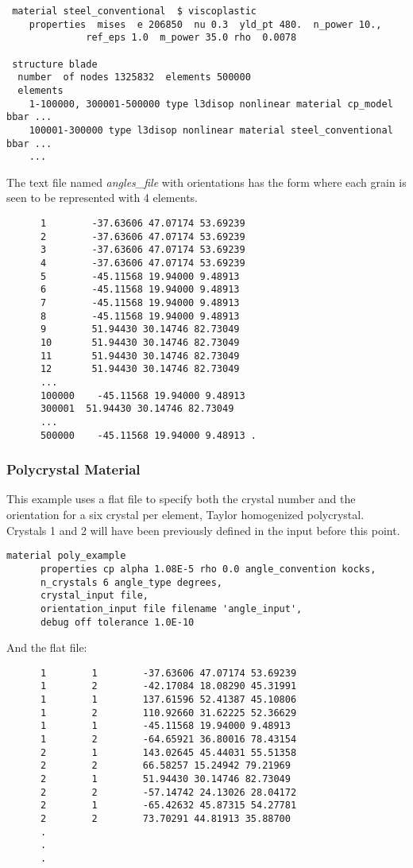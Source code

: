 \documentclass[11pt]{report}
\numberwithin{equation}{section}
\newcommand{\ti}{\emph}
\newcommand{\noi}{\noindent}
\begin{document}
{\begin{verbatim}
 material steel_conventional  $ viscoplastic
    properties  mises  e 206850  nu 0.3  yld_pt 480.  n_power 10.,
              ref_eps 1.0  m_power 35.0 rho  0.0078

 structure blade
  number  of nodes 1325832  elements 500000
  elements
    1-100000, 300001-500000 type l3disop nonlinear material cp_model  bbar ...
    100001-300000 type l3disop nonlinear material steel_conventional  bbar ...
    ...
\end{verbatim}
\small

\noi The text file named \ti{angles\_file} with orientations has the form where
each grain is seen to be represented with 4 elements.
\small
\begin{verbatim}
      1        -37.63606 47.07174 53.69239
      2        -37.63606 47.07174 53.69239
      3        -37.63606 47.07174 53.69239
      4        -37.63606 47.07174 53.69239
      5        -45.11568 19.94000 9.48913 
      6        -45.11568 19.94000 9.48913 
      7        -45.11568 19.94000 9.48913 
      8        -45.11568 19.94000 9.48913 
      9        51.94430 30.14746 82.73049
      10       51.94430 30.14746 82.73049
      11       51.94430 30.14746 82.73049
      12       51.94430 30.14746 82.73049
      ...
      100000    -45.11568 19.94000 9.48913 
      300001  51.94430 30.14746 82.73049
      ...
      500000    -45.11568 19.94000 9.48913 .
\end{verbatim}
\normalsize


\subsubsection{Polycrystal Material}
This example uses a flat file to specify both the crystal number and the 
orientation for a six crystal per element, Taylor homogenized polycrystal. Crystals
1 and 2 will have been previously defined in the input before this point.

\small
\begin{verbatim}
material poly_example
      properties cp alpha 1.08E-5 rho 0.0 angle_convention kocks,
      n_crystals 6 angle_type degrees,
      crystal_input file,
      orientation_input file filename 'angle_input',
      debug off tolerance 1.0E-10
\end{verbatim}
\normalsize

\noindent And the flat file:
\small
\begin{verbatim}
      1        1        -37.63606 47.07174 53.69239
      1        2        -42.17084 18.08290 45.31991
      1        1        137.61596 52.41387 45.10806
      1        2        110.92660 31.62225 52.36629
      1        1        -45.11568 19.94000 9.48913 
      1        2        -64.65921 36.80016 78.43154
      2        1        143.02645 45.44031 55.51358
      2        2        66.58257 15.24942 79.21969
      2        1        51.94430 30.14746 82.73049
      2        2        -57.14742 24.13026 28.04172
      2        1        -65.42632 45.87315 54.27781
      2        2        73.70291 44.81913 35.88700
      .
      .
      .
\end{verbatim}
\normalsize

}
\end{document}
